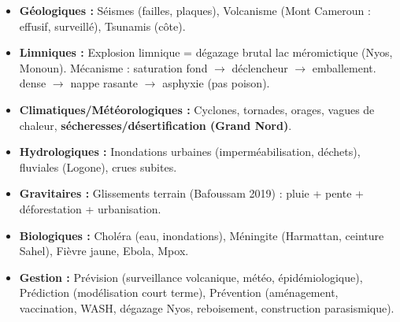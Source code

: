 \documentclass[11pt]{article}
\begin{document}
\begin{aretenir}
\begin{itemize}
    \item \textbf{Géologiques :} Séismes (failles, plaques), Volcanisme (Mont Cameroun : effusif, surveillé), Tsunamis (côte).
    \item \textbf{Limniques :} Explosion limnique = dégazage brutal  lac méromictique (Nyos, Monoun). Mécanisme : saturation fond $\rightarrow$ déclencheur $\rightarrow$ emballement.  dense $\rightarrow$ nappe rasante $\rightarrow$ asphyxie (pas poison).
    \item \textbf{Climatiques/Météorologiques :} Cyclones, tornades, orages, vagues de chaleur, \textbf{sécheresses/désertification (Grand Nord)}.
    \item \textbf{Hydrologiques :} Inondations urbaines (imperméabilisation, déchets), fluviales (Logone), crues subites.
    \item \textbf{Gravitaires :} Glissements terrain (Bafoussam 2019) : pluie + pente + déforestation + urbanisation.
    \item \textbf{Biologiques :} Choléra (eau, inondations), Méningite (Harmattan, ceinture Sahel), Fièvre jaune, Ebola, Mpox.
    \item \textbf{Gestion :} Prévision (surveillance volcanique, météo, épidémiologique), Prédiction (modélisation court terme), Prévention (aménagement, vaccination, WASH, dégazage Nyos, reboisement, construction parasismique).
\end{itemize}
\end{aretenir}
\end{document}
